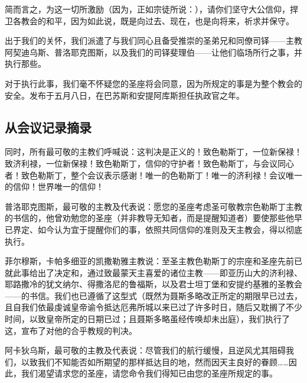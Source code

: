 简而言之，为这一切所激励（因为，正如宗徒所说：），请你们坚守大公信仰，捍卫各教会的和平，因为如此说，既是向过去、现在，也是向将来，祈求并保守。\par

出于我们的关怀，我们派遣了与我们同心且备受推崇的圣弟兄和同僚司铎——主教阿契迪乌斯、普洛耶克图斯，以及我们的司铎斐理伯——让他们临场所行之事，并执行那些。\par

对于执行此事，我们毫不怀疑您的圣座将会同意，因为所规定的事是为整个教会的安全。发布于五月八日，在巴苏斯和安提阿库斯担任执政官之年。\par


\subsection{从会议记录摘录}

同时，所有最可敬的主教们呼喊说：这判决是正义的！致色勒斯丁，一位新保禄！致济利禄，一位新保禄！致色勒斯丁，信仰的守护者！致色勒斯丁，与会议同心者！致色勒斯丁，整个会议表示感谢！唯一的色勒斯丁！唯一的济利禄！会议唯一的信仰！世界唯一的信仰！\par

普洛耶克图斯，最可敬的主教及代表说：愿您的圣座考虑圣可敬教宗色勒斯丁主教的书信的，他曾劝勉您的圣座（并非教导无知者，而是提醒知道者）要使那些他早已界定、如今认为宜于提醒你们的事，依照共同信仰的准则及天主教会，得以彻底执行。\par

菲尔穆斯，卡帕多细亚的凯撒勒雅主教说：至圣主教色勒斯丁的宗座和圣座先前已就此事给出了决定和，通过致最蒙天主喜爱的诸位主教——即亚历山大的济利禄、耶路撒冷的犹文纳尔、得撒洛尼的鲁福斯，以及君士坦丁堡和安提约基雅的圣教会——的书信。我们也已遵循了这型式（既然为聂斯多略改正所定的期限早已过去，且自我们依最虔诚皇帝谕令抵达厄弗所城以来已过了许多时日，随后又耽搁了不少时间，以致皇帝所定的日期已过；且聂斯多略虽经传唤却未出庭），我们执行了这，宣布了对他的合乎教规的判决。\par

阿卡狄乌斯，最可敬的主教及代表说：尽管我们的航行缓慢，且逆风尤其阻碍我们，以致我们不知能否如所期望的那样抵达目的地，然而因天主良好的眷顾……因此，我们渴望请求您的圣座，请您命令我们得知已由您的圣座所规定的事。\par

